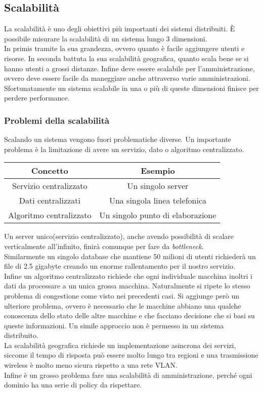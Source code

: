 \documentclass[12pt]{article}
\begin{document}
\subsection{Scalabilità}
La scalabilità è uno degli obiettivi più importanti dei sistemi distribuiti. È possibile misurare la scalabilità di un sistema lungo 3 dimensioni. \\ 
In primis tramite la sua grandezza, ovvero quanto è facile aggiungere utenti e risorse.
In seconda battuta la sua scalabilità geografica, quanto scala bene se si hanno utenti a grossi distanze.
Infine deve essere scalabile per l'amministrazione, ovvero deve essere facile da maneggiare anche attraverso varie amministrazioni.
\\ Sfortunatamente un sistema scalabile in una o più di queste dimensioni finisce per perdere performance.

\subsubsection{Problemi della scalabilità}
Scalando un sistema vengono fuori problematiche diverse. Un importante problema è la limitazione di avere un servizio, dato o algoritmo centralizzato. 
\begin{center}
\begin{tabular}{|c|c|}
\hline
\textbf{Concetto} & \textbf{Esempio} \\
\hline
Servizio centralizzato & Un singolo server  \\
\hline
Dati centralizzati & Una singola linea telefonica  \\
\hline
Algoritmo centralizzato & Un singolo punto di elaborazione \\
\hline
\end{tabular}
\end{center}
Un server unico(servizio centralizzato), anche avendo possibilità di scalare verticalmente all'infinito, finirà comunque per fare da \emph{bottleneck}. \\ 
Similarmente un singolo database che mantiene 50 milioni di utenti richiederà un file di 2.5 gigabyte creando un enorme rallentamento per il nostro servizio. \\ 
Infine un algoritmo centralizzato richiede che ogni individuale macchina inoltri i dati da processare a un unica grossa macchina. Naturalmente si ripete lo stesso problema di congestione come visto nei precedenti casi. Si aggiunge però un ulteriore problema, ovvero è necessario che le macchine abbiano una qualche conoscenza dello stato delle altre macchine e che facciano decisione che si basi su queste informazioni. Un simile approccio non è permesso in un sistema distribuito.
\\ 
La scalabilità geografica richiede un implementazione asincrona dei servizi, siccome il tempo di risposta può essere molto lungo tra regioni e una trasmissione wireless è molto meno sicura rispetto a una rete VLAN.
\\ 
Infine è un grosso problema fare una scalabilità di amministrazione, perché ogni dominio ha una serie di policy da rispettare.
\end{document}
